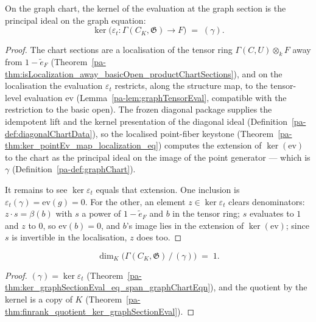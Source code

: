 \begin{theorem}
  \label{pa-thm:ker_graphSectionEval_eq_span_graphChartEqn}
  \leanok

  On the graph chart, the kernel of the evaluation at the graph section is the principal
  ideal on the graph equation:
  \[
    \ker\bigl(\varepsilon_t \colon \Gamma(C_K, \mathfrak G) \to F\bigr)
      \;=\; (\gamma).
  \]
\end{theorem}
\begin{proof}
  \leanok
  The chart sections are a localisation of the tensor ring \(\Gamma(C,U) \otimes_k F\)
  away from \(1 - \tilde e_F\)
  (Theorem~\ref{pa-thm:isLocalization_away_basicOpen_productChartSections}), and on the
  localisation the evaluation \(\varepsilon_t\) restricts, along the structure map, to the
  tensor-level evaluation \(\mathrm{ev}\) (Lemma~\ref{pa-lem:graphTensorEval}, compatible with
  the restriction to the basic open). The frozen diagonal package supplies the idempotent
  lift and the kernel presentation of the diagonal ideal
  (Definition~\ref{pa-def:diagonalChartData}), so the localised point-fiber keystone
  (Theorem~\ref{pa-thm:ker_pointEv_map_localization_eq}) computes the extension of
  \(\ker(\mathrm{ev})\) to the chart as the principal ideal on the image of the point
  generator — which is \(\gamma\) (Definition~\ref{pa-def:graphChart}).

  It remains to see \(\ker \varepsilon_t\) equals that extension. One inclusion is
  \(\varepsilon_t(\gamma) = \mathrm{ev}(g) = 0\). For the other, an element
  \(z \in \ker\varepsilon_t\) clears denominators: \(z \cdot s = \beta(b)\) with \(s\) a
  power of \(1 - \tilde e_F\) and \(b\) in the tensor ring; \(s\) evaluates to \(1\) and
  \(z\) to \(0\), so \(\mathrm{ev}(b) = 0\), and \(b\)'s image lies in the extension of
  \(\ker(\mathrm{ev})\); since \(s\) is invertible in the localisation, \(z\) does too.
\end{proof}

\begin{theorem}
  \label{pa-thm:finrank_quotient_span_graphChartEqn}
  \leanok

  \[
    \dim_K \bigl(\Gamma(C_K, \mathfrak G) \,/\, (\gamma)\bigr) \;=\; 1 .
  \]
\end{theorem}
\begin{proof}
  \leanok
  \((\gamma) = \ker\varepsilon_t\)
  (Theorem~\ref{pa-thm:ker_graphSectionEval_eq_span_graphChartEqn}), and the quotient by the
  kernel is a copy of \(K\)
  (Theorem~\ref{pa-thm:finrank_quotient_ker_graphSectionEval}).
\end{proof}

